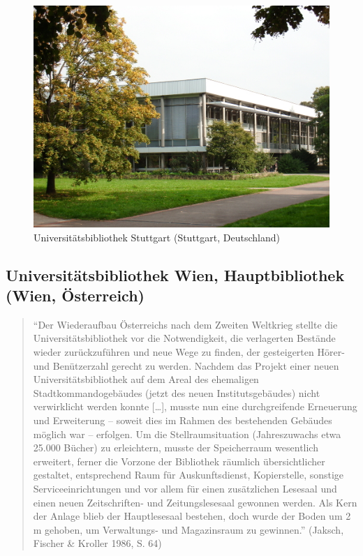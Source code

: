 \documentclass[a4paper,
fontsize=11pt,
oneside,
numbers=noperiodatend,
parskip=half-,
bibliography=totoc,
final
]{scrartcl}
\begin{document}
\begin{figure}[htbp]
\centering
\includegraphics{./img/037.jpg}
\caption{Universitätsbibliothek Stuttgart (Stuttgart,
Deutschland)}
\end{figure}

\subsection*{Universitätsbibliothek Wien, Hauptbibliothek (Wien,
Österreich)}\label{universituxe4tsbibliothek-wien-hauptbibliothek-wien-uxf6sterreich}

\begin{quote}
\enquote{Der Wiederaufbau Österreichs nach dem Zweiten Weltkrieg stellte
die Universitäts\-bibliothek vor die Notwendigkeit, die verlagerten
Bestände wieder zurückzuführen und neue Wege zu finden, der gesteigerten
Hörer- und Benützerzahl gerecht zu werden. Nachdem das Projekt einer
neuen Universitätsbibliothek auf dem Areal des ehemaligen
Stadtkommandogebäudes (jetzt des neuen Institutsgebäudes) nicht
verwirklicht werden konnte {[}\ldots{}{]}, musste nun eine
durchgreifende Erneuerung und Erweiterung -- soweit dies im Rahmen des
bestehenden Gebäudes möglich war -- erfolgen. Um die Stellraumsituation
(Jahreszuwachs etwa 25.000 Bücher) zu erleichtern, musste der
Speicherraum wesentlich erweitert, ferner die Vorzone der Bibliothek
räumlich übersichtlicher gestaltet, entsprechend Raum für
Auskunftsdienst, Kopierstelle, sonstige Serviceeinrichtungen und vor
allem für einen zusätzlichen Lesesaal und einen neuen Zeitschriften- und
Zeitungslesesaal gewonnen werden. Als Kern der Anlage blieb der
Hauptlesesaal bestehen, doch wurde der Boden um 2 m gehoben, um
Verwaltungs- und Magazinsraum zu gewinnen.} (Jaksch, Fischer \& Kroller
1986, S. 64)
\end{quote}
\end{document}
